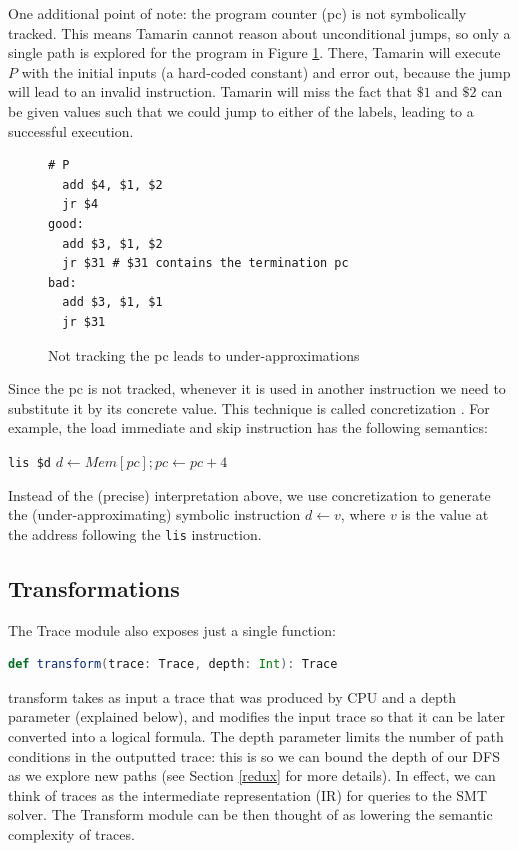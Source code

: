 \documentclass{llncs}
\begin{document}
One additional point of note: the program counter (\textsf{pc}) is not symbolically tracked. This means Tamarin cannot reason about unconditional jumps, so only a single path is explored for the program in Figure \ref{pcnottrack}. There, Tamarin will execute $P$ with the initial inputs (a hard-coded constant) and error out, because the jump will lead to an invalid instruction. Tamarin will miss the fact that $\$1$ and $\$2$ can be given values such that we could jump to either of the labels, leading to a successful  execution. 

\begin{figure}
\begin{lstlisting}
# P
  add $4, $1, $2
  jr $4
good:
  add $3, $1, $2
  jr $31 # $31 contains the termination pc
bad:
  add $3, $1, $1
  jr $31    
\end{lstlisting} 
\caption{Not tracking the \textsf{pc} leads to under-approximations}
\label{pcnottrack}
\end{figure}

Since the \textsf{pc} is not tracked, whenever it is used in another instruction we need to substitute it by its concrete value. This technique is called concretization \cite{david2016specification}. For example, the load immediate and skip instruction has the following semantics:

\lstinline{lis $d} \hspace{2cm} $d \gets Mem[pc]; pc \gets pc + 4$

Instead of the (precise) interpretation above, we use concretization to generate the (under-approximating) symbolic instruction $d \gets v$, where $v$ is the value at the address following the \lstinline{lis} instruction.


\subsection{Transformations}
\label{transsection}

The \textsf{Trace} module also exposes just a single function:

\begin{lstlisting}[language=scala]
def transform(trace: Trace, depth: Int): Trace
\end{lstlisting}

\textsf{transform} takes as input a trace that was produced by \textsf{CPU} and a \textsf{depth} parameter (explained below), and modifies the input trace so that it can be later converted into a logical formula. The \textsf{depth} parameter limits the number of path conditions in the outputted trace: this is so we can bound the depth of our DFS as we explore new paths (see Section \ref{redux} for more details). In effect, we can think of traces as the intermediate representation (IR) for queries to the SMT solver. The \textsf{Transform} module can be then thought of as lowering the semantic complexity of traces.
\end{document}
